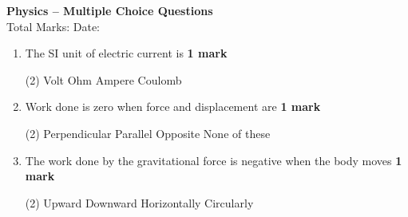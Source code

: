 \documentclass[a4paper,12pt]{article}
\begin{document}
\begin{center}
    {\LARGE \textbf{Physics – Multiple Choice Questions}}\\
    \vspace{5pt}
    {\large Total Marks: \underline{\hspace{3cm}} \hfill Date: \underline{\hspace{3cm}}}
\end{center}

\begin{enumerate}

\item The SI unit of electric current is \hfill \textbf{1 mark}
\begin{tasks}(2)
    \task Volt
    \task Ohm
    \task Ampere
    \task Coulomb
\end{tasks}

\item Work done is zero when force and displacement are \hfill \textbf{1 mark}
\begin{tasks}(2)
    \task Perpendicular
    \task Parallel
    \task Opposite
    \task None of these
\end{tasks}

\item The work done by the gravitational force is negative when the body moves \hfill \textbf{1 mark}
\begin{tasks}(2)
    \task Upward
    \task Downward
    \task Horizontally
    \task Circularly
\end{tasks}


\end{enumerate}
\end{document}
